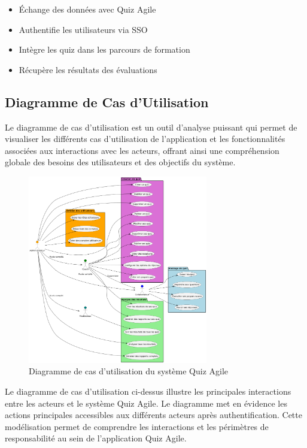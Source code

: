 \documentclass[12pt,a4paper]{report}
\begin{document}
\begin{itemize}
\item Échange des données avec Quiz Agile
\item Authentifie les utilisateurs via SSO
\item Intègre les quiz dans les parcours de formation
\item Récupère les résultats des évaluations
\end{itemize}

\subsection{Diagramme de Cas d'Utilisation}

Le diagramme de cas d'utilisation est un outil d'analyse puissant qui permet de visualiser les différents cas d'utilisation de l'application et les fonctionnalités associées aux interactions avec les acteurs, offrant ainsi une compréhension globale des besoins des utilisateurs et des objectifs du système.

\begin{figure}[htbp]
    \centering
    \includegraphics[width=0.7\textwidth]{latex_media/media/image14.png}
    \caption{Diagramme de cas d'utilisation du système Quiz Agile}
    \label{fig:cas-utilisation}
\end{figure}

Le diagramme de cas d'utilisation ci-dessus illustre les principales interactions entre les acteurs et le système Quiz Agile. Le diagramme met en évidence les actions principales accessibles aux différents acteurs après authentification. Cette modélisation permet de comprendre les interactions et les périmètres de responsabilité au sein de l'application Quiz Agile.
\end{document}
